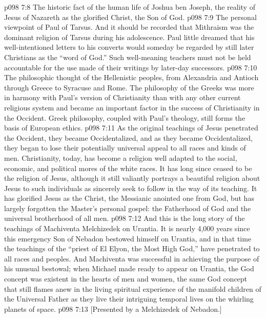 \vs p098 7:8 \bibnobreakspace The historic fact of the human life of Joshua ben Joseph, the reality of Jesus of Nazareth as the glorified Christ, the Son of God.
\vs p098 7:9 \bibnobreakspace The personal viewpoint of Paul of Tarsus. And it should be recorded that Mithraism was the dominant religion of Tarsus during his adolescence. Paul little dreamed that his well\hyp{}intentioned letters to his converts would someday be regarded by still later Christians as the “word of God.” Such well\hyp{}meaning teachers must not be held accountable for the use made of their writings by later\hyp{}day successors.
\vs p098 7:10 \bibnobreakspace The philosophic thought of the Hellenistic peoples, from Alexandria and Antioch through Greece to Syracuse and Rome. The philosophy of the Greeks was more in harmony with Paul’s version of Christianity than with any other current religious system and became an important factor in the success of Christianity in the Occident. Greek philosophy, coupled with Paul’s theology, still forms the basis of European ethics.
\vs p098 7:11 \pc As the original teachings of Jesus penetrated the Occident, they became Occidentalized, and as they became Occidentalized, they began to lose their potentially universal appeal to all races and kinds of men. Christianity, today, has become a religion well adapted to the social, economic, and political mores of the white races. It has long since ceased to be the religion of Jesus, although it still valiantly portrays a beautiful religion about Jesus to such individuals as sincerely seek to follow in the way of its teaching. It has glorified Jesus as the Christ, the Messianic anointed one from God, but has largely forgotten the Master’s personal gospel: the Fatherhood of God and the universal brotherhood of all men.
\vs p098 7:12 \pc And this is the long story of the teachings of Machiventa Melchizedek on Urantia. It is nearly 4,000 years since this emergency Son of Nebadon bestowed himself on Urantia, and in that time the teachings of the “priest of El Elyon, the Most High God,” have penetrated to all races and peoples. And Machiventa was successful in achieving the purpose of his unusual bestowal; when Michael made ready to appear on Urantia, the God concept was existent in the hearts of men and women, the same God concept that still flames anew in the living spiritual experience of the manifold children of the Universal Father as they live their intriguing temporal lives on the whirling planets of space.
\vsetoff
\vs p098 7:13 [Presented by a Melchizedek of Nebadon.]
\quizlink
